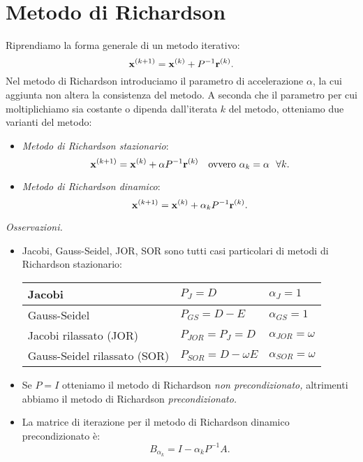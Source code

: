 \section{Metodo di Richardson}
Riprendiamo la forma generale di un metodo iterativo:
\begin{equation*}
\mathbf{x}^{( k+1)} =\mathbf{x}^{(k)} +P^{-1}\mathbf{r}^{(k)}.
\end{equation*}
Nel metodo di Richardson introduciamo il parametro di accelerazione $\alpha $, la cui aggiunta non altera la consistenza del metodo.
A seconda che il parametro per cui moltiplichiamo sia costante o dipenda dall'iterata $k$ del metodo, otteniamo due varianti del metodo:
\begin{itemize}
\item \textit{Metodo di Richardson stazionario}:
\begin{equation*}
\x^{( k+1)} =\x^{(k)} +\alpha P^{-1}\mathbf{r}^{(k)} \quad \text{ovvero } \alpha _{k} =\alpha \ \ \forall k.
\end{equation*}
\item \textit{Metodo di Richardson dinamico}:
\begin{equation*}
\mathbf{x}^{( k+1)} =\mathbf{x}^{(k)} +\alpha _{k} P^{-1}\mathbf{r}^{(k)}.
\end{equation*}
\end{itemize}
\textit{Osservazioni.}
\begin{itemize}
\item Jacobi, Gauss-Seidel, JOR, SOR sono tutti casi particolari di metodi di Richardson stazionario:
\begin{table}[H]
  \centering
  \def\arraystretch{1.5}
  \begin{tabular}{|l|l|l|}
    \hline
    Jacobi                       & $P_{J} =D$& $\alpha_{J} =1$\\ \hline
    Gauss-Seidel                 & $P_{GS} = D-E$ & $\alpha_{GS}=1$ \\ \hline
    Jacobi rilassato (JOR)       & $P_{JOR}=P_J=D$ & $\alpha_{JOR}=\omega$ \\ \hline
    Gauss-Seidel rilassato (SOR) & $P_{SOR}=D-\omega E$ & $\alpha_{SOR}=\omega$ \\ \hline
  \end{tabular}
\end{table}
\item Se $P=I$ otteniamo il metodo di Richardson \textit{non precondizionato,} altrimenti abbiamo il metodo di Richardson \textit{precondizionato.}
\item La matrice di iterazione per il metodo di Richardson dinamico precondizionato è:
\begin{equation*}
B_{\alpha _{k}} =I-\alpha _{k} P^{-1} A.
\end{equation*}
\end{itemize}
